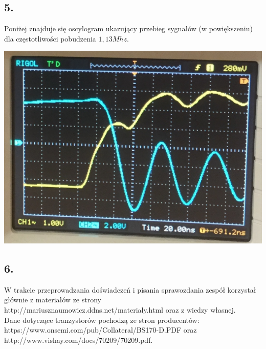 \documentclass[polish,a4paper]{article}
\begin{document}
\newpage

\subsection*{5.}
Poniżej znajduje się oscylogram ukazujący przebieg sygnałów (w powiększeniu) dla częstotliwości pobudzenia $1,13Mhz$.\\
\begin{center}
\includegraphics[scale=0.4]{oscylogram}
\end{center}


\subsection*{6.}




\begin{thebibliography}{9}

  W trakcie przeprowadzania doświadczeń i pisania sprawozdania zespół korzystał głównie z materiałów ze strony http://mariusznaumowicz.ddns.net/materialy.html oraz z wiedzy własnej.\\
Dane dotyczące tranzystorów pochodzą ze stron producentów: https://www.onsemi.com/pub/Collateral/BS170-D.PDF oraz http://www.vishay.com/docs/70209/70209.pdf.

\end{thebibliography}
\end{document}

